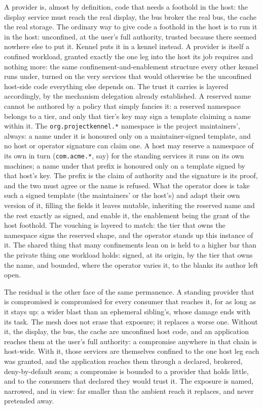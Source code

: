 A provider is, almost by definition, code that needs a foothold in the
host: the display service must reach the real display, the bus broker
the real bus, the cache the real storage. The ordinary way to give code
a foothold in the host is to run it in the host: unconfined, at the
user's full authority, trusted because there seemed nowhere else to put
it. Kennel puts it in a kennel instead. A provider is itself a confined
workload, granted exactly the one leg into the host its job requires and
nothing more: the same confinement-and-enablement structure every other
kennel runs under, turned on the very services that would otherwise be
the unconfined host-side code everything else depends on. The trust it
carries is layered accordingly, by the mechanism delegation already
established. A reserved name cannot be authored by a policy that simply
fancies it: a reserved namespace belongs to a tier, and only that tier's
key may sign a template claiming a name within it. The
\texttt{org.projectkennel.*} namespace is the project maintainers',
always: a name under it is honoured only on a maintainer-signed
template, and no host or operator signature can claim one. A host may
reserve a namespace of its own in turn (\texttt{com.acme.*}, say) for
the standing services it runs on its own machines; a name under that
prefix is honoured only on a template signed by that host's key. The
prefix is the claim of authority and the signature is its proof, and the
two must agree or the name is refused. What the operator does is take
such a signed template (the maintainers' or the host's) and adapt their
own version of it, filling the fields it leaves mutable, inheriting the
reserved name and the rest exactly as signed, and enable it, the
enablement being the grant of the host foothold. The vouching is layered
to match: the tier that owns the namespace signs the reserved shape, and
the operator stands up this instance of it. The shared thing that many
confinements lean on is held to a higher bar than the private thing one
workload holds: signed, at its origin, by the tier that owns the name,
and bounded, where the operator varies it, to the blanks its author left
open.

The residual is the other face of the same permanence. A standing
provider that is compromised is compromised for every consumer that
reaches it, for as long as it stays up: a wider blast than an ephemeral
sibling's, whose damage ends with its task. The mesh does not erase that
exposure; it replaces a worse one. Without it, the display, the bus, the
cache are unconfined host code, and an application reaches them at the
user's full authority: a compromise anywhere in that chain is host-wide.
With it, those services are themselves confined to the one host leg each
was granted, and the application reaches them through a declared,
brokered, deny-by-default seam; a compromise is bounded to a provider
that holds little, and to the consumers that declared they would trust
it. The exposure is named, narrowed, and in view: far smaller than the
ambient reach it replaces, and never pretended away.

